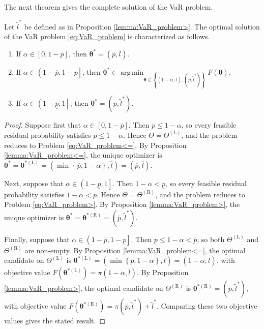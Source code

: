 \documentclass[a4paper,12pt]{article}
\DeclareMathOperator*{\argmin}{arg\,min}
\begin{document}
The next theorem gives the complete solution of the VaR problem.
\begin{theorem}\label{thm:var}
Let $\tilde{l}^*$ be defined as in Proposition \ref{lemma:VaR_problem>}. The optimal solution of the VaR problem \eqref{eq:VaR_problem} is characterized as follows.
\begin{enumerate}
\item[(i)] If $\alpha\in\left[0,1-\overline{p}\right]$, then ${\bm\theta}^*=\left(\overline{p},\overline{l}\right)$.
\item[(ii)] If $\alpha\in\left(1-\overline{p},1-\underline{p}\right]$, then ${\bm\theta}^*\in\argmin_{{\bm\theta}\in\left\{\left(1-\alpha,\overline{l}\right),\left(\overline{p},\tilde{l}^*\right)\right\}}F\left({\bm\theta}\right)$.
\item[(iii)] If $\alpha\in\left(1-\underline{p},1\right]$, then ${\bm\theta}^*=\left(\overline{p},\tilde{l}^*\right)$.
\end{enumerate}
\end{theorem}
\begin{proof}
Suppose first that $\alpha\in\left[0,1-\overline{p}\right]$. Then $\overline{p}\leq 1-\alpha$, so every feasible residual probability satisfies $p\leq 1-\alpha$. Hence $\Theta=\Theta^{\left(\text{L}\right)}$, and the problem reduces to Problem \eqref{eq:VaR_problem<=}. By Proposition \ref{lemma:VaR_problem<=}, the unique optimizer is ${\bm\theta}^*={\bm\theta}^{*\left(\text{L}\right)}=\left(\min\left\{\overline{p},1-\alpha\right\},\overline{l}\right)=\left(\overline{p},\overline{l}\right)$.

Next, suppose that $\alpha\in\left(1-\underline{p},1\right]$. Then $1-\alpha<\underline{p}$, so every feasible residual probability satisfies $1-\alpha<p$. Hence $\Theta=\Theta^{\left(\text{R}\right)}$, and the problem reduces to Problem \eqref{eq:VaR_problem>}. By Proposition \ref{lemma:VaR_problem>}, the unique optimizer is ${\bm\theta}^*={\bm\theta}^{*\left(\text{R}\right)}=\left(\overline{p},\tilde{l}^*\right)$.

Finally, suppose that $\alpha\in\left(1-\overline{p},1-\underline{p}\right]$. Then $\underline{p}\leq 1-\alpha<\overline{p}$, so both $\Theta^{\left(\text{L}\right)}$ and $\Theta^{\left(\text{R}\right)}$ are non-empty. By Proposition \ref{lemma:VaR_problem<=}, the optimal candidate on $\Theta^{\left(\text{L}\right)}$ is ${\bm\theta}^{*\left(\text{L}\right)}=\left(\min\left\{\overline{p},1-\alpha\right\},\overline{l}\right)=\left(1-\alpha,\overline{l}\right)$, with objective value $F\left({\bm\theta}^{*\left(\text{L}\right)}\right)=\pi\left(1-\alpha,\overline{l}\right)$. By Proposition \ref{lemma:VaR_problem>}, the optimal candidate on $\Theta^{\left(\text{R}\right)}$ is ${\bm\theta}^{*\left(\text{R}\right)}=\left(\overline{p},\tilde{l}^*\right)$, with objective value $F\left({\bm\theta}^{*\left(\text{R}\right)}\right)=\pi\left(\overline{p},\tilde{l}^*\right)+\tilde{l}^*$. Comparing these two objective values gives the stated result.
\end{proof}
\end{document}
